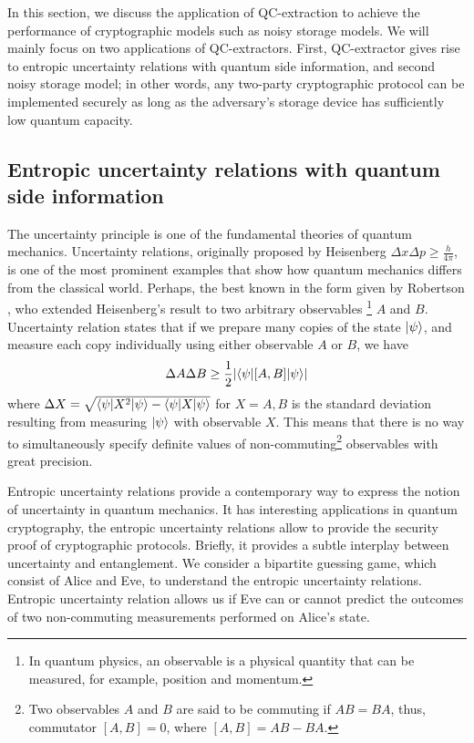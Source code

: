 In this section, we discuss the application of QC-extraction to achieve the performance of cryptographic models such as noisy storage models. We will mainly focus on two applications of QC-extractors. First, QC-extractor gives rise to entropic uncertainty relations with quantum side information, and second noisy storage model; in other words, any two-party cryptographic protocol can be implemented securely as long as the adversary’s storage device has sufficiently low quantum capacity.  

\subsection{Entropic uncertainty relations with quantum side information}
The uncertainty principle is one of the fundamental theories of quantum mechanics. 
Uncertainty relations, originally proposed by Heisenberg $\Delta x \Delta p \geq \frac{h}{4\pi}$, is one of the most prominent examples that show how quantum mechanics differs from the classical world. Perhaps, the best known in the form given by Robertson \cite{robertson1929uncertainty}, who extended Heisenberg's result to two arbitrary observables \footnote{In quantum physics, an observable is a physical quantity that can be measured, for example, position and momentum.} $A$ and $B$. Uncertainty relation states that if we prepare many copies of the state $|\psi \rangle$, and measure each copy individually using either observable $A$ or $B$, we have 
\[\Delta A \Delta B \geq \frac{1}{2} |\langle \psi|[A,B]|\psi \rangle|\]
where $\Delta X = \sqrt{\langle \psi|X^2|\psi \rangle - \langle \psi|X|\psi \rangle }$ for $X = A, B$ is the standard deviation resulting from measuring $|\psi \rangle$ with observable $X$. This means that there is no way to simultaneously specify definite values of non-commuting\footnote{Two observables $A$ and $B$ are said to be commuting if $AB = BA$, thus, commutator $[A,B] = 0$,  where $ [A,B] = AB-BA$.} observables with great precision. 


Entropic uncertainty relations provide a contemporary way to express the notion of uncertainty in quantum mechanics. It has interesting applications in quantum cryptography, the entropic uncertainty relations allow to provide the security proof of cryptographic protocols.  Briefly, it provides a subtle interplay between uncertainty and entanglement.  We consider a bipartite guessing game, which consist of Alice and Eve, to understand the  entropic uncertainty relations. Entropic uncertainty relation allows us if Eve can or cannot predict the outcomes of two non-commuting measurements performed on Alice’s state.

